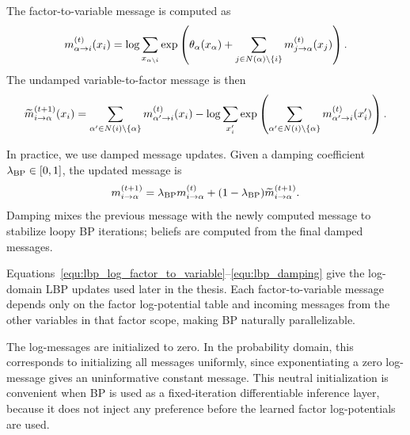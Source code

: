 The factor-to-variable message is computed as
\begin{equation}
    \label{equ:lbp_log_factor_to_variable}
    m_{\alpha\rightarrow i}^{(t)}(x_i) = \log \sum_{x_{\alpha\setminus i}}
    \exp\left(
        \theta_{\alpha}(x_{\alpha})
        +
        \sum_{j\in N(\alpha)\setminus\{i\}}
        m_{j\rightarrow \alpha}^{(t)}(x_j)
    \right).
\end{equation}
The undamped variable-to-factor message is then
\begin{equation}
    \label{equ:lbp_log_variable_to_factor}
    \widetilde{m}_{i\rightarrow \alpha}^{(t+1)}(x_i)
    =
    \sum_{\alpha'\in N(i)\setminus\{\alpha\}}
    m_{\alpha'\rightarrow i}^{(t)}(x_i)
    -
    \log
    \sum_{x'_i}
    \exp\left(
        \sum_{\alpha'\in N(i)\setminus\{\alpha\}}
        m_{\alpha'\rightarrow i}^{(t)}(x'_i)
    \right).
\end{equation}

In practice, we use damped message updates. Given a damping coefficient
$\lambda_{\mathrm{BP}}\in[0,1]$, the updated message is
\begin{equation}
    \label{equ:lbp_damping}
    m_{i\rightarrow \alpha}^{(t+1)}
    =
    \lambda_{\mathrm{BP}} m_{i\rightarrow \alpha}^{(t)}
    +
    (1-\lambda_{\mathrm{BP}})
    \widetilde{m}_{i\rightarrow \alpha}^{(t+1)} .
\end{equation}
Damping mixes the previous message with the newly computed message to stabilize loopy BP iterations; beliefs are computed from the final damped messages.

Equations~\eqref{equ:lbp_log_factor_to_variable}--\eqref{equ:lbp_damping} give the log-domain LBP updates used later in the thesis. Each factor-to-variable message depends only on the factor log-potential table and incoming messages from the other variables in that factor scope, making BP naturally parallelizable.

The log-messages are initialized to zero. In the probability domain, this corresponds to initializing all messages uniformly, since exponentiating a zero log-message gives an uninformative constant message. This neutral initialization is convenient when BP is used as a fixed-iteration differentiable inference layer, because it does not inject any preference before the learned factor log-potentials are used.

